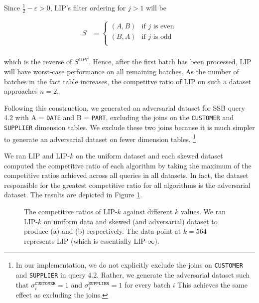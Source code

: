 Since $\frac{1}{2} - \varepsilon > 0$, LIP's filter ordering for $j > 1$ will be

\begin{align*}
S &= 
    \begin{cases}
    (A, B) & \text{if $j$ is even} \\[0.5em]
    (B, A) & \text{if $j$ is odd} \\
    \end{cases}\\[0.5em]
\end{align*}

which is the reverse of $S^{OPT}$. 
Hence, after the first batch has been processed, LIP will have worst-case performance on all remaining batches. 
As the number of batches in the fact table increases, the competitve ratio of LIP on such a dataset approaches $n =2$.

Following this construction, we generated an adversarial dataset for SSB query 4.2 with A = \texttt{DATE} and B = \texttt{PART},
excluding the joins on the \texttt{CUSTOMER} and \texttt{SUPPLIER} dimension tables.
We exclude these two joins because it is much simpler to generate an adversarial dataset on fewer dimension tables.
\footnote{In our implementation, we do not explicitly exclude the joins on \texttt{CUSTOMER} and \texttt{SUPPLIER} in query 4.2. 
Rather, we generate the adversarial dataset such that $\sigma_i^{\texttt{CUSTOMER}}=1$ and $\sigma_i^{\texttt{SUPPLIER}}=1$ for every batch $i$ 
This achieves the same effect as excluding the joins.}



We ran LIP and LIP-$k$ on the uniform dataset and each skewed dataset computed the competitive ratio of each algorithm by taking the maximum of the competitive ratios achieved across all queries in all datasets. In fact, the dataset responsible for the greatest competitive ratio for all algorithms is the adversarial dataset.  The results are depicted in Figure \ref{fig:cr}. 

\begin{figure}
    \centering

    \quad
    
    \caption{The competitive ratios of LIP-$k$ against different $k$ values. We ran LIP-$k$ on uniform data and skewed (and adversarial) dataset to produce (a) and (b) respectively. The data point at $k = 564$ represents LIP (which is essentially LIP-$\infty$).}
    \label{fig:cr}
\end{figure}

